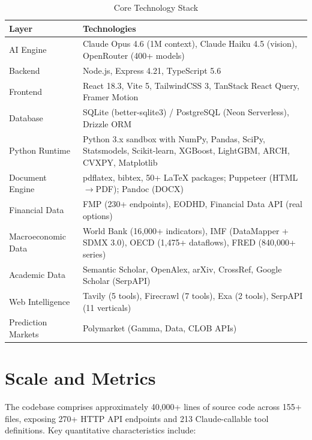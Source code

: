 \begin{table}[H]
\centering
\caption{Core Technology Stack}
\label{tab:tech-stack}
\begin{tabularx}{\textwidth}{lX}
\toprule
\textbf{Layer} & \textbf{Technologies} \\
\midrule
AI Engine & Claude Opus 4.6 (1M context), Claude Haiku 4.5 (vision), OpenRouter (400+ models) \\
Backend & Node.js, Express 4.21, TypeScript 5.6 \\
Frontend & React 18.3, Vite 5, TailwindCSS 3, TanStack React Query, Framer Motion \\
Database & SQLite (better-sqlite3) / PostgreSQL (Neon Serverless), Drizzle ORM \\
Python Runtime & Python 3.x sandbox with NumPy, Pandas, SciPy, Statsmodels, Scikit-learn, XGBoost, LightGBM, ARCH, CVXPY, Matplotlib \\
Document Engine & pdflatex, bibtex, 50+ \LaTeX{} packages; Puppeteer (HTML$\to$PDF); Pandoc (DOCX) \\
Financial Data & FMP (230+ endpoints), EODHD, Financial Data API (real options) \\
Macroeconomic Data & World Bank (16,000+ indicators), IMF (DataMapper + SDMX 3.0), OECD (1,475+ dataflows), FRED (840,000+ series) \\
Academic Data & Semantic Scholar, OpenAlex, arXiv, CrossRef, Google Scholar (SerpAPI) \\
Web Intelligence & Tavily (5 tools), Firecrawl (7 tools), Exa (2 tools), SerpAPI (11 verticals) \\
Prediction Markets & Polymarket (Gamma, Data, CLOB APIs) \\
\bottomrule
\end{tabularx}
\end{table}

\section{Scale and Metrics}
\label{sec:overview:metrics}

The codebase comprises approximately 40,000+ lines of source code across 155+ files, exposing 270+ HTTP API endpoints and 213 Claude-callable tool definitions.
Key quantitative characteristics include:

